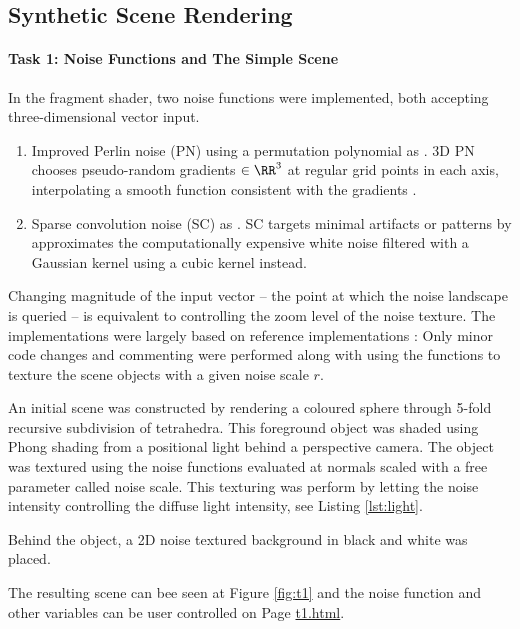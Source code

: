 \documentclass[12pt,fleqn]{article}
\begin{document}
\subsection{Synthetic Scene Rendering}
\paragraph{Task 1: Noise Functions and The Simple Scene}
In the fragment shader, two noise functions were implemented, both accepting three-dimensional vector input.
\begin{enumerate}
    \item Improved Perlin noise (PN) using a permutation polynomial as \citeauthor{mcewan2012efficient} \cite{mcewan2012efficient}. 3D PN chooses pseudo-random gradients $\in \RR^3$ at regular grid points in each axis, interpolating a smooth function consistent with the gradients \cite{gustavson2005simplex}. 
    \item Sparse convolution noise (SC) as \citeauthor{frisvad2007fast} \cite{frisvad2007fast}. SC targets minimal artifacts or patterns by approximates the computationally expensive white noise filtered with a Gaussian kernel using a cubic kernel instead.
\end{enumerate}
Changing magnitude of the input vector -- the point at which the noise landscape is queried -- is equivalent to controlling the zoom level of the noise texture.
The implementations were largely based on reference implementations \cite{frisvad2016exploring}:
Only minor code changes and commenting were performed along with using the functions to texture the scene objects with a given noise scale $r$.

An initial scene was constructed by rendering a coloured sphere through 5-fold recursive subdivision of tetrahedra.
This foreground object was shaded using Phong shading from a positional light behind a perspective camera.
The object was textured using the noise functions evaluated at normals scaled with a free parameter called noise scale.
This texturing was perform by letting the noise intensity controlling the diffuse light intensity, see Listing \ref{lst:light}.

Behind the object, a 2D noise textured background in black and white was placed.

The resulting scene can bee seen at Figure \ref{fig:t1} and the noise function and other variables can be user controlled on Page \href{https://www.student.dtu.dk/~s183911/proj/webgl-site/t1.html}{t1.html}.

\end{document}
